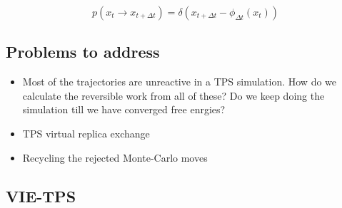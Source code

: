\documentclass{article}
\begin{document}
\begin{equation}
p(x_t\rightarrow x_{t+\Delta t}) = \delta(x_{t+\Delta t}-\phi_{\Delta t}(x_t))
\end{equation}

\subsection{Problems to address}

\begin{itemize}
\item Most of the trajectories are unreactive in a TPS simulation. How do we calculate the 
reversible work from all of these? Do we keep doing the simulation till we have converged 
free enrgies? 
\item TPS virtual replica exchange \cite{Brotzakis19JChemPhys151p174111} 
\item Recycling the rejected Monte-Carlo moves \cite{Frenkel17571}
\end{itemize}
\subsection{VIE-TPS}





\end{document}
